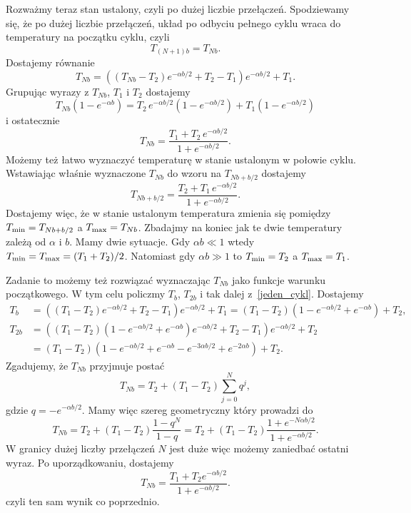 \documentclass[11pt,a4paper]{article}
\begin{document}
Rozważmy teraz stan ustalony, czyli po dużej liczbie przełączeń. Spodziewamy się, że po dużej liczbie przełączeń, układ po odbyciu pełnego cyklu wraca do temperatury na początku cyklu, czyli
\begin{equation}
	T_{(N+1)b} = T_{Nb}.
\end{equation}
Dostajemy równanie
\begin{equation}
	T_{Nb} = \left( (T_{Nb} - T_2)e^{-\alpha b/2} + T_2 - T_1\right) e^{-\alpha b/2} + T_1.
\end{equation}
Grupując wyrazy z $T_{Nb}$, $T_1$ i $T_2$ dostajemy
\begin{equation}
	T_{Nb}(1 - e^{-\alpha b}) = T_2 \,e^{-\alpha b/2} (1 - e^{-\alpha b/2}) + T_1 (1 - e^{-\alpha b/2})
\end{equation}
i ostatecznie
\begin{equation}
	T_{Nb} = \frac{T_1 + T_2 \,e^{-\alpha b/2}}{1 + e^{-\alpha b/2}}.
\end{equation}
Możemy też łatwo wyznaczyć temperaturę w stanie ustalonym w połowie cyklu. Wstawiając właśnie wyznaczone $T_{Nb}$ do wzoru na $T_{Nb +b/2}$ dostajemy
\begin{equation}
	T_{Nb + b/2} = \frac{T_2 + T_1\, e^{-\alpha b/2}}{1 + e^{-\alpha b/2}}.
\end{equation}
Dostajemy więc, że w stanie ustalonym temperatura zmienia się pomiędzy $T_{\rm min} = T_{Nb +b/2}$ a $T_{\rm max} = T_{Nb}$. Zbadajmy na koniec jak te dwie temperatury zależą od $\alpha$ i $b$. Mamy dwie sytuacje. Gdy $\alpha b \ll 1$ wtedy $T_{\rm min} = T_{\rm max} = (T_1 + T_2)/2$. Natomiast gdy $\alpha b \gg 1$ to $T_{\rm min} = T_2$ a $T_{\rm max} = T_1$. 


Zadanie to możemy też rozwiązać wyznaczając $T_{Nb}$ jako funkcje warunku początkowego. W tym celu policzmy $T_b$, $T_{2b}$ i tak dalej z~\eqref{jeden_cykl}. Dostajemy
\begin{align}
	T_b &= ((T_1 - T_2) e^{-\alpha b/2} + T_2 - T_1)e^{-\alpha b/2} + T_1 = (T_1-T_2)(1 - e^{-\alpha b/2} + e^{-\alpha b}) + T_2, \\
	T_{2b} &= ((T_1 - T_2)(1 - e^{-\alpha b/2} + e^{-\alpha b}) e^{-\alpha b/2} + T_2 - T_1)e^{-\alpha b/2} + T_2 \\
	&= (T_1 - T_2) ( 1 - e^{-\alpha b/2} + e^{-\alpha b} - e^{-3\alpha b/2} + e^{-2\alpha b}) + T_2.
\end{align}
Zgadujemy, że $T_{Nb}$ przyjmuje postać
\begin{equation}
	T_{Nb} = T_2 + (T_1 - T_2) \sum_{j=0}^N q^j,
\end{equation}
gdzie $q = - e^{-\alpha b/2}$. Mamy więc szereg geometryczny który prowadzi do
\begin{equation}
	T_{Nb} = T_2 + (T_1 - T_2) \frac{1 - q^{N}}{1 - q} = T_2 + (T_1 - T_2) \frac{1 + e^{- N \alpha b/2} }{1 + e^{-\alpha b/2}}.
\end{equation}
W granicy dużej liczby przełączeń $N$ jest duże więc możemy zaniedbać ostatni wyraz. Po uporządkowaniu, dostajemy
\begin{equation}
	T_{Nb} = \frac{T_1 + T_2 e^{-\alpha b/2}}{1 + e^{-\alpha b/2}}.
\end{equation}
czyli ten sam wynik co poprzednio.
\end{document}
